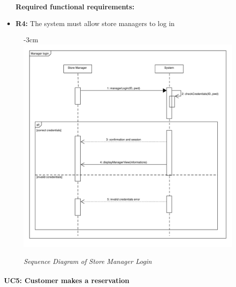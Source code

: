 \documentclass{article}
\begin{document}
\begin{center}
					\begin{itemize}
					\bigskip
					\bigskip
					\bigskip
					 {\bfseries Required functional requirements: }
					\item {\bfseries R4: } The system must allow store managers to log in
					

					\end{itemize}

							\begin{figure}
								\begin{adjustwidth} {-3cm}{}
									\centering
									\includegraphics[scale=0.7]{SD/4_managerLogin.pdf}\\
									\caption{\emph{Sequence Diagram of Store Manager Login}}
								\end{adjustwidth}
							\end{figure}
					
				\end{center}
				\newpage
			
			\paragraph{UC5: Customer makes a reservation}
			
\end{document}
